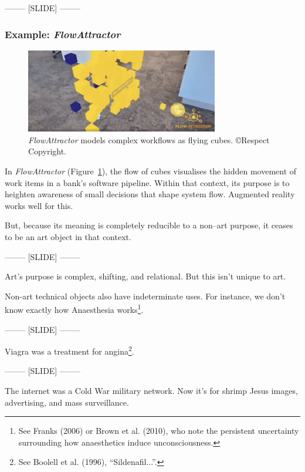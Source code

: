 \documentclass[letter:wpaper]{article}
\begin{document}
    -------- [SLIDE] --------

    \subsubsection{Example: \emph{FlowAttractor}}

    \begin{figure}[h]
        \includegraphics[width=3.31in]{flow-attractor.png}
        \caption{\emph{FlowAttractor} models complex workflows as flying cubes. \copyright Respect Copyright.}
        \label{fig:flow-attractor}
    \end{figure}

    In \emph{FlowAttractor} (Figure~\ref{fig:flow-attractor}), the flow of cubes visualises the hidden movement of work items in a bank’s software pipeline. Within that context, its purpose is to heighten awareness of small decisions that shape system flow. Augmented reality works well for this.

    But, because its meaning is completely reducible to a non–art purpose, it ceases to be an art object in that context.

    -------- [SLIDE] --------

    Art’s purpose is complex, shifting, and relational. But this isn’t unique to art.

    Non-art technical objects also have indeterminate uses. For instance, we don't know exactly how Anaesthesia works\footnote{
        See Franks (2006) or Brown et al. (2010), who note the persistent uncertainty surrounding how anaesthetics induce unconsciousness.
    }.

    -------- [SLIDE] --------

    Viagra was a treatment for angina\footnote{
        See Boolell et al. (1996), “Sildenafil...”.
    }.

    -------- [SLIDE] --------

    The internet was a Cold War military network. Now it's for shrimp Jesus images, advertising, and mass surveillance.
\end{document}
